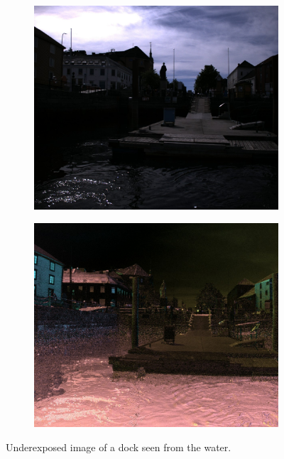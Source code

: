\begin{figure}[H]
    \begin{subfigure}[T]{.49\textwidth}
        \includegraphics[width=\textwidth]{figures/pictures/img_10170_s0.jpg}
    \end{subfigure} \hfill
    \begin{subfigure}[T]{.49\textwidth}
        \includegraphics[width=\textwidth]{figures/pictures/img_10170_pol.jpg}
    \end{subfigure}
    \caption{Underexposed image of a dock seen from the water.}
\end{figure}
\vspace{-.5cm}

